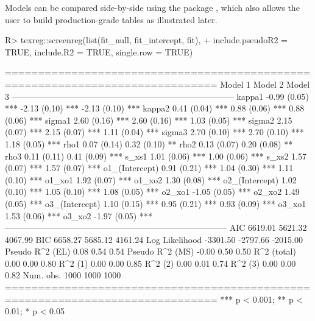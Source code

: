 \documentclass[%
    twoside, openright, titlepage, numbers=noenddot,%
    cleardoublepage=empty,%
    abstract=false,%
    BCOR=5.5mm, paper=a5, fontsize=10pt,%
]{scrreprt}
\begin{document}
Models can be compared side-by-side using the  package \citep{Leifeld:2013}, which also allows the user to build production-grade tables as illustrated later.
%
\begin{Schunk}
\begin{Sinput}
R> texreg::screenreg(list(fit_null, fit_intercept, fit),
+    include.pseudoR2 = TRUE, include.R2 = TRUE, single.row = TRUE)
\end{Sinput}
\begin{Soutput}
==============================================================================
                 Model 1              Model 2              Model 3            
------------------------------------------------------------------------------
kappa1              -0.99 (0.05) ***     -2.13 (0.10) ***     -2.13 (0.10) ***
kappa2               0.41 (0.04) ***      0.88 (0.06) ***      0.88 (0.06) ***
sigma1               2.60 (0.16) ***      2.60 (0.16) ***      1.03 (0.05) ***
sigma2               2.15 (0.07) ***      2.15 (0.07) ***      1.11 (0.04) ***
sigma3               2.70 (0.10) ***      2.70 (0.10) ***      1.18 (0.05) ***
rho1                                      0.07 (0.14)          0.32 (0.10) ** 
rho2                                      0.13 (0.07)          0.20 (0.08) ** 
rho3                                      0.11 (0.11)          0.41 (0.09) ***
s_xs1                                     1.01 (0.06) ***      1.00 (0.06) ***
s_xs2                                     1.57 (0.07) ***      1.57 (0.07) ***
o1_(Intercept)       0.91 (0.21) ***      1.04 (0.30) ***      1.11 (0.10) ***
o1_xo1                                                         1.92 (0.07) ***
o1_xo2                                                         1.30 (0.08) ***
o2_(Intercept)       1.02 (0.10) ***      1.05 (0.10) ***      1.08 (0.05) ***
o2_xo1                                                        -1.05 (0.05) ***
o2_xo2                                                         1.49 (0.05) ***
o3_(Intercept)       1.10 (0.15) ***      0.95 (0.21) ***      0.93 (0.09) ***
o3_xo1                                                         1.53 (0.06) ***
o3_xo2                                                        -1.97 (0.05) ***
------------------------------------------------------------------------------
AIC               6619.01              5621.32              4067.99           
BIC               6658.27              5685.12              4161.24           
Log Likelihood   -3301.50             -2797.66             -2015.00           
Pseudo R^2 (EL)      0.08                 0.54                 0.54           
Pseudo R^2 (MS)     -0.00                 0.50                 0.50           
R^2 (total)          0.00                 0.00                 0.80           
R^2 (1)              0.00                 0.00                 0.85           
R^2 (2)              0.00                 0.01                 0.74           
R^2 (3)              0.00                 0.00                 0.82           
Num. obs.         1000                 1000                 1000              
==============================================================================
*** p < 0.001; ** p < 0.01; * p < 0.05
\end{Soutput}
\end{Schunk}
\end{document}
